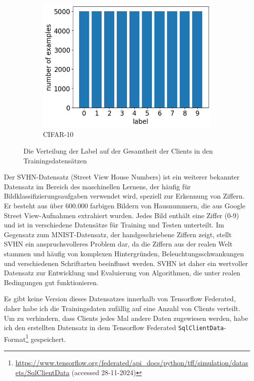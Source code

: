 \begin{figure}[tb]
\begin{subfigure}{0.32\textwidth}
		\includegraphics[width=\textwidth]{Bilder/cifar_label_distribution.png}
		\caption{CIFAR-10}
	\end{subfigure}
	\caption{Die Verteilung der Label auf der Gesamtheit der Clients in den Trainingsdatensätzen}
	\label{fig:label-distribution-all}
\end{figure}

Der SVHN-Datensatz (Street View House Numbers) ist ein weiterer bekannter Datensatz im Bereich des maschinellen Lernens, der häufig für Bildklassifizierungsaufgaben verwendet wird, speziell zur Erkennung von Ziffern. Er besteht aus über 600.000 farbigen Bildern von Hausnummern, die aus Google Street View-Aufnahmen extrahiert wurden. Jedes Bild enthält eine Ziffer (0-9) und ist in verschiedene Datensätze für Training und Testen unterteilt. Im Gegensatz zum MNIST-Datensatz, der handgeschriebene Ziffern zeigt, stellt SVHN ein anspruchsvolleres Problem dar, da die Ziffern aus der realen Welt stammen und häufig von komplexen Hintergründen, Beleuchtungsschwankungen und verschiedenen Schriftarten beeinflusst werden. SVHN ist daher ein wertvoller Datensatz zur Entwicklung und Evaluierung von Algorithmen, die unter realen Bedingungen gut funktionieren.

Es gibt keine Version dieses Datensatzes innerhalb von Tensorflow Federated, daher habe ich die Trainingsdaten zufällig auf eine Anzahl von Clients verteilt. Um zu verhindern, dass Clients jedes Mal andere Daten zugewiesen werden, habe ich den erstellten Datensatz in dem Tensorflow Federated \texttt{SqlClientData}-Format\footnote{\url{https://www.tensorflow.org/federated/api_docs/python/tff/simulation/datasets/SqlClientData} (accessed 28-11-2024)} gespeichert.

